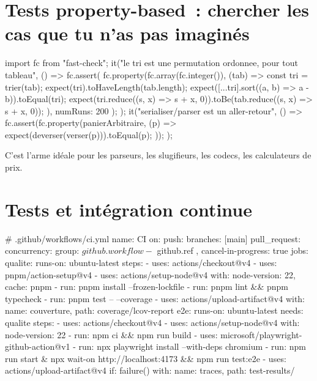 \section{Tests property-based~: chercher les cas que tu n'as pas imagin\'es}

\begin{codejs}
import fc from "fast-check";
it("le tri est une permutation ordonnee, pour tout tableau", () => {
  fc.assert(
    fc.property(fc.array(fc.integer()), (tab) => {
      const tri = trier(tab);
      expect(tri).toHaveLength(tab.length);
      expect([...tri].sort((a, b) => a - b)).toEqual(tri);
      expect(tri.reduce((s, x) => s + x, 0)).toBe(tab.reduce((s, x) => s + x, 0));
    }),
    { numRuns: 200 }
  );
});
it("serialiser/parser est un aller-retour", () => {
  fc.assert(fc.property(panierArbitraire, (p) => {
    expect(deverser(verser(p))).toEqual(p);
  }));
});
\end{codejs}

C'est l'arme id\'eale pour les parseurs, les slugifieurs, les codecs, les calculateurs de prix.

\section{Tests et int\'egration continue}

\begin{codeyml}
# .github/workflows/ci.yml
name: CI
on:
  push: { branches: [main] }
  pull_request:
concurrency: { group: ${{ github.workflow }}-${{ github.ref }}, cancel-in-progress: true }
jobs:
  qualite:
    runs-on: ubuntu-latest
    steps:
      - uses: actions/checkout@v4
      - uses: pnpm/action-setup@v4
      - uses: actions/setup-node@v4
        with: { node-version: 22, cache: pnpm }
      - run: pnpm install --frozen-lockfile
      - run: pnpm lint && pnpm typecheck
      - run: pnpm test -- --coverage
      - uses: actions/upload-artifact@v4
        with: { name: couverture, path: coverage/lcov-report }
  e2e:
    runs-on: ubuntu-latest
    needs: qualite
    steps:
      - uses: actions/checkout@v4
      - uses: actions/setup-node@v4
        with: { node-version: 22 }
      - run: npm ci && npm run build
      - uses: microsoft/playwright-github-action@v1
      - run: npx playwright install --with-deps chromium
      - run: npm run start & npx wait-on http://localhost:4173 && npm run test:e2e
      - uses: actions/upload-artifact@v4
        if: failure()
        with: { name: traces, path: test-results/ }
\end{codeyml}

